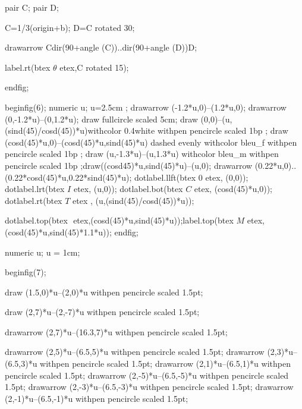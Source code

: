 \documentclass[12pt]{article}
\begin{document}
pair C; %
pair D; %


C=1/3(origin+b);
D=C rotated 30;

drawarrow C{dir(90+angle (C))}..{dir(90+angle (D))}D;

label.rt(btex $\theta$ etex,C rotated 15);

endfig;


beginfig(6);
numeric u;
u=2.5cm ;
drawarrow (-1.2*u,0)--(1.2*u,0);
drawarrow (0,-1.2*u)--(0,1.2*u);
draw fullcircle scaled 5cm;
draw (0,0)--(u,(sind(45)/cosd(45))*u)withcolor 0.4white withpen pencircle scaled 1bp ;
draw (cosd(45)*u,0)--(cosd(45)*u,sind(45)*u) dashed evenly withcolor bleu_f withpen pencircle scaled 1bp ;
draw (u,-1.3*u)--(u,1.3*u) withcolor bleu_m withpen pencircle scaled 1bp ;draw((cosd45)*u,sind(45)*u)--(u,0);
drawarrow (0.22*u,0)..(0.22*cosd(45)*u,0.22*sind(45)*u);
dotlabel.llft(btex $0$ etex, (0,0));
dotlabel.lrt(btex $I$ etex, (u,0));
dotlabel.bot(btex $C$ etex, (cosd(45)*u,0));
dotlabel.rt(btex $T$ etex , (u,(sind(45)/cosd(45))*u));

dotlabel.top(btex $ $ etex,(cosd(45)*u,sind(45)*u));label.top(btex $M$ etex,(cosd(45)*u,sind(45)*1.1*u));
endfig;







numeric u;
u = 1cm;



beginfig(7);

draw (1.5,0)*u--(2,0)*u withpen pencircle scaled 1.5pt;

draw (2,7)*u--(2,-7)*u withpen pencircle scaled 1.5pt;

drawarrow (2,7)*u--(16.3,7)*u withpen pencircle scaled 1.5pt;

drawarrow (2,5)*u--(6.5,5)*u withpen pencircle scaled 1.5pt;
drawarrow (2,3)*u--(6.5,3)*u withpen pencircle scaled 1.5pt;
drawarrow (2,1)*u--(6.5,1)*u withpen pencircle scaled 1.5pt;
drawarrow (2,-5)*u--(6.5,-5)*u withpen pencircle scaled 1.5pt;
drawarrow (2,-3)*u--(6.5,-3)*u withpen pencircle scaled 1.5pt;
drawarrow (2,-1)*u--(6.5,-1)*u withpen pencircle scaled 1.5pt;
\end{document}
